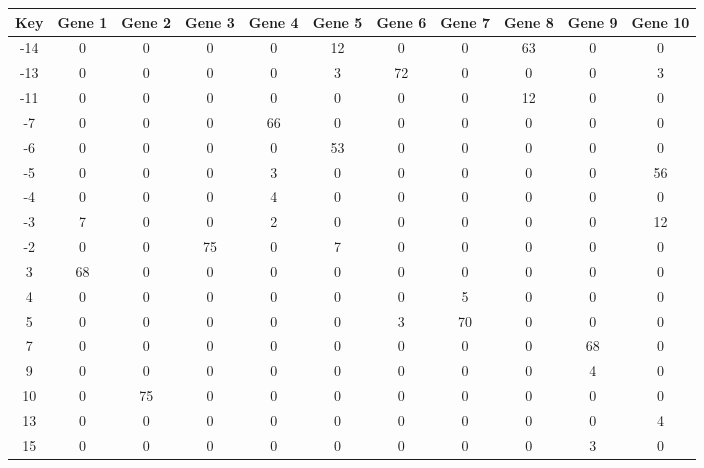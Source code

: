 \begin{tabular}{|c|c|c|c|c|c|c|c|c|c|c|}
\hline
Key & Gene 1 & Gene 2 & Gene 3 & Gene 4 & Gene 5 & Gene 6 & Gene 7 & Gene 8 & Gene 9 & Gene 10 \\
\hline
-14 & 0 & 0 & 0 & 0 & 12 & 0 & 0 & 63 & 0 & 0 \\
-13 & 0 & 0 & 0 & 0 & 3 & 72 & 0 & 0 & 0 & 3 \\
-11 & 0 & 0 & 0 & 0 & 0 & 0 & 0 & 12 & 0 & 0 \\
-7 & 0 & 0 & 0 & 66 & 0 & 0 & 0 & 0 & 0 & 0 \\
-6 & 0 & 0 & 0 & 0 & 53 & 0 & 0 & 0 & 0 & 0 \\
-5 & 0 & 0 & 0 & 3 & 0 & 0 & 0 & 0 & 0 & 56 \\
-4 & 0 & 0 & 0 & 4 & 0 & 0 & 0 & 0 & 0 & 0 \\
-3 & 7 & 0 & 0 & 2 & 0 & 0 & 0 & 0 & 0 & 12 \\
-2 & 0 & 0 & 75 & 0 & 7 & 0 & 0 & 0 & 0 & 0 \\
3 & 68 & 0 & 0 & 0 & 0 & 0 & 0 & 0 & 0 & 0 \\
4 & 0 & 0 & 0 & 0 & 0 & 0 & 5 & 0 & 0 & 0 \\
5 & 0 & 0 & 0 & 0 & 0 & 3 & 70 & 0 & 0 & 0 \\
7 & 0 & 0 & 0 & 0 & 0 & 0 & 0 & 0 & 68 & 0 \\
9 & 0 & 0 & 0 & 0 & 0 & 0 & 0 & 0 & 4 & 0 \\
10 & 0 & 75 & 0 & 0 & 0 & 0 & 0 & 0 & 0 & 0 \\
13 & 0 & 0 & 0 & 0 & 0 & 0 & 0 & 0 & 0 & 4 \\
15 & 0 & 0 & 0 & 0 & 0 & 0 & 0 & 0 & 3 & 0 \\
\hline
\end{tabular}